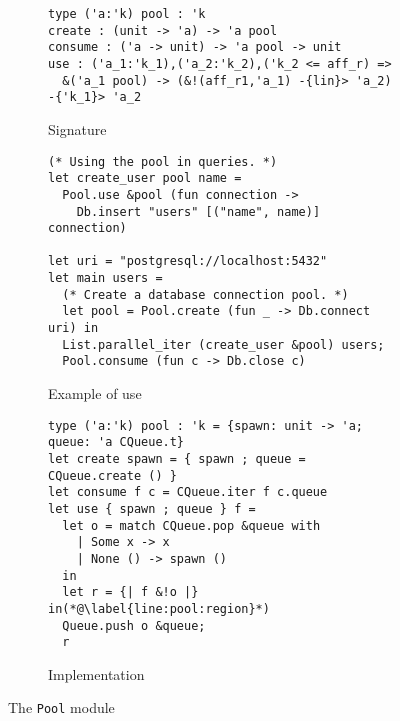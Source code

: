 \begin{figure}[tp]
  \centering
  \begin{subfigure}[t]{1\linewidth}
\begin{lstlisting}
type ('a:'k) pool : 'k
create : (unit -> 'a) -> 'a pool
consume : ('a -> unit) -> 'a pool -> unit
use : ('a_1:'k_1),('a_2:'k_2),('k_2 <= aff_r) =>
  &('a_1 pool) -> (&!(aff_r1,'a_1) -{lin}> 'a_2) -{'k_1}> 'a_2
\end{lstlisting}
    \vspace{-10pt}
    \caption{Signature}
    \label{intf:pool}

\begin{lstlisting}
(* Using the pool in queries. *)
let create_user pool name =
  Pool.use &pool (fun connection ->
    Db.insert "users" [("name", name)] connection)

let uri = "postgresql://localhost:5432"
let main users =
  (* Create a database connection pool. *)
  let pool = Pool.create (fun _ -> Db.connect uri) in
  List.parallel_iter (create_user &pool) users;
  Pool.consume (fun c -> Db.close c)
\end{lstlisting}
    \vspace{-10pt}
    \caption{Example of use}
    \label{ex:pool}
  \end{subfigure}

  \begin{subfigure}[t]{1\linewidth}
\begin{lstlisting}
type ('a:'k) pool : 'k = {spawn: unit -> 'a; queue: 'a CQueue.t}
let create spawn = { spawn ; queue = CQueue.create () }
let consume f c = CQueue.iter f c.queue
let use { spawn ; queue } f =
  let o = match CQueue.pop &queue with
    | Some x -> x
    | None () -> spawn ()
  in
  let r = {| f &!o |} in(*@\label{line:pool:region}*)
  Queue.push o &queue;
  r
\end{lstlisting}
    \vspace{-15pt}
    \caption{Implementation}
    \label{impl:pool}
  \end{subfigure}

  \caption{The \texttt{Pool} module}
  \label{fig:pool}
\end{figure}

